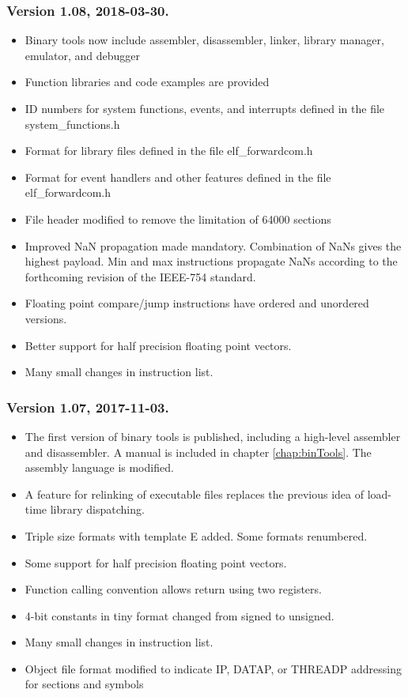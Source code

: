 \documentclass[forwardcom.tex]{subfiles}
\begin{document}
\subsubsection{Version 1.08, 2018-03-30.}
\begin{itemize}

\item Binary tools now include assembler, disassembler, linker, library manager, emulator, and debugger
\item Function libraries and code examples are provided
\item ID numbers for system functions, events, and interrupts defined in the file system\_functions.h
\item Format for library files defined in the file elf\_forwardcom.h
\item Format for event handlers and other features defined in the file elf\_forwardcom.h
\item File header modified to remove the limitation of 64000 sections
\item Improved NaN propagation made mandatory. Combination of NaNs gives the highest payload. 
Min and max instructions propagate NaNs according to the forthcoming revision of the IEEE-754 standard.
\item Floating point compare/jump instructions have ordered and unordered versions.
\item Better support for half precision floating point vectors.
\item Many small changes in instruction list. 
\end{itemize}


\subsubsection{Version 1.07, 2017-11-03.}
\begin{itemize}
\item The first version of binary tools is published, including a high-level assembler and disassembler. A manual is included in chapter \ref{chap:binTools}. The assembly language is modified.
\item A feature for relinking of executable files replaces the previous idea of load-time library dispatching.
\item Triple size formats with template E added. Some formats renumbered.
\item Some support for half precision floating point vectors.
\item Function calling convention allows return using two registers.
\item 4-bit constants in tiny format changed from signed to unsigned.
\item Many small changes in instruction list.
\item Object file format modified to indicate IP, DATAP, or THREADP addressing for sections and symbols
\end{itemize}
\end{document}
